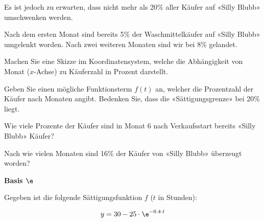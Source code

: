 Es ist jedoch zu erwarten, dass nicht mehr als 20\% aller Käufer auf
«Silly Blubb» umschwenken werden.

Nach dem ersten Monat sind bereits 5\% der Waschmittelkäufer auf
«Silly Blubb» umgelenkt worden. Nach zwei weiteren Monaten sind wir
bei 8\% gelandet.


\begin{bbwAufgabenBlock}
\item Machen Sie eine Skizze im Koordinatensystem, welche die
Abhängigkeit von Monat ($x$-Achse) zu Käuferzahl in Prozent darstellt.


\item Geben Sie einen mögliche Funktionsterm $f(t)$ an, welcher die
Prozentzahl der Käufer nach Monaten angibt. Bedenken Sie, dass die
«Sättigungsgrenze» bei 20\% liegt.


\item Wie viele Prozente der Käufer sind in Monat 6 nach Verkaufsstart
  bereits «Silly Blubb» Käufer?
  

\item Nach wie vielen Monaten sind 16\% der Käufer von «Silly Blubb»
  überzeugt worden?


\end{bbwAufgabenBlock}


\platzFuerBerechnungenBisEndeSeite{}


\bbwActAufgabenNr{} \textbf{Basis $\e$}

Gegeben ist die folgende Sättigungsfunktion $f$ ($t$ in Stunden):

$$y=30-25\cdot{}\e^{-0.4\cdot{}t}$$

